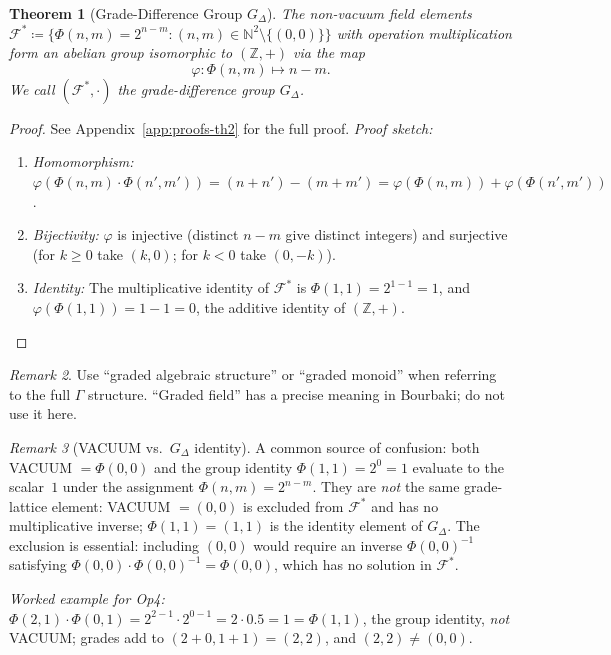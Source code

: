 \documentclass[12pt,a4paper]{article}
\theoremstyle{plain}
\newtheorem{theorem}{Theorem}[section]
\theoremstyle{definition}
\theoremstyle{remark}
\newtheorem{remark}[theorem]{Remark}
\begin{document}
\begin{theorem}[Grade-Difference Group $G_\Delta$]
\label{thm:gdg}
The non-vacuum field elements $\mathcal{F}^* \coloneqq \{\Phi(n,m) = 2^{n-m} : (n,m) \in \mathbb{N}^2 \setminus \{(0,0)\}\}$
with operation multiplication form an abelian group isomorphic to $(\mathbb{Z},+)$
via the map
\[
  \varphi\colon \Phi(n,m) \mapsto n - m.
\]
We call $(\mathcal{F}^*, \cdot)$ the \emph{grade-difference group} $G_\Delta$.
\end{theorem}
\begin{proof}
See Appendix~\ref{app:proofs-th2} for the full proof.
\emph{Proof sketch:}
\begin{enumerate}[nosep]
  \item \emph{Homomorphism:} $\varphi(\Phi(n,m)\cdot \Phi(n',m'))
         = (n{+}n')-(m{+}m') = \varphi(\Phi(n,m))+\varphi(\Phi(n',m'))$.
        \checkmark
  \item \emph{Bijectivity:} $\varphi$ is injective (distinct $n{-}m$ give
        distinct integers) and surjective (for $k\geq 0$ take $(k,0)$;
        for $k<0$ take $(0,-k)$). \checkmark
  \item \emph{Identity:} The multiplicative identity of $\mathcal{F}^*$ is
        $\Phi(1,1)=2^{1-1}=1$, and $\varphi(\Phi(1,1))=1-1=0$, the additive
        identity of $(\mathbb{Z},+)$. \checkmark
        [Note: VACUUM $= \Phi(0,0)$ is \emph{excluded} from $\mathcal{F}^*$;
        the identity of the group is $\Phi(1,1)$, not VACUUM.]
\end{enumerate}
\end{proof}

\begin{remark}
Use ``graded algebraic structure'' or ``graded monoid'' when referring to the
full $\Gamma$ structure. ``Graded field'' has a precise meaning in Bourbaki;
do not use it here.
\end{remark}

\begin{remark}[VACUUM vs.\ $G_\Delta$ identity]\label{rem:vacuum-identity}
A common source of confusion: both VACUUM $= \Phi(0,0)$ and the group identity
$\Phi(1,1) = 2^0 = 1$ evaluate to the scalar~$1$ under the assignment
$\Phi(n,m) = 2^{n-m}$.
They are \emph{not} the same grade-lattice element:
VACUUM $= (0,0)$ is excluded from $\mathcal{F}^*$ and has no multiplicative
inverse; $\Phi(1,1) = (1,1)$ is the identity element of $G_\Delta$.
The exclusion is essential: including $(0,0)$ would require an inverse
$\Phi(0,0)^{-1}$ satisfying $\Phi(0,0) \cdot \Phi(0,0)^{-1} = \Phi(0,0)$, which has
no solution in $\mathcal{F}^*$.

\emph{Worked example for Op4:}
$\Phi(2,1) \cdot \Phi(0,1) = 2^{2-1}\cdot 2^{0-1} = 2\cdot 0.5 = 1 = \Phi(1,1)$,
the group identity, \emph{not} VACUUM; grades add to $(2{+}0,1{+}1)=(2,2)$,
and $(2,2)\neq(0,0)$.
\end{remark}
\end{document}
